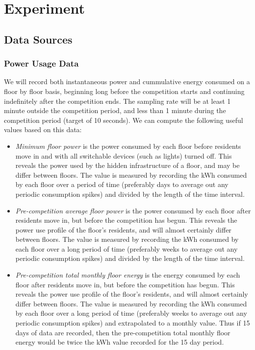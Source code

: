 \chapter{Experiment}


\section{Data Sources}

\subsection{Power Usage Data}
\label{sec:power-usage-data}

We will record both instantaneous power and cummulative energy consumed on a floor by floor basis, beginning long before the competition starts and continuing indefinitely after the competition ends. The sampling rate will be at least 1 minute outside the competition period, and less than 1 minute during the competition period (target of 10 seconds). We can compute the following useful values based on this data:

\begin{itemize}

\item \emph{Minimum floor power} is the power consumed by each floor before residents move in and with all switchable devices (such as lights) turned off. This reveals the power used by the hidden infrastructure of a floor, and may be differ between floors. The value is measured by recording the kWh consumed by each floor over a period of time (preferably days to average out any periodic consumption spikes) and divided by the length of the time interval.

\item \emph{Pre-competition average floor power} is the power consumed by each floor after residents move in, but before the competition has begun. This reveals the power use profile of the floor's residents, and will almost certainly differ between floors. The value is measured by recording the kWh consumed by each floor over a long period of time (preferably weeks to average out any periodic consumption spikes) and divided by the length of the time interval.

\item \emph{Pre-competition total monthly floor energy} is the energy consumed by each floor after residents move in, but before the competition has begun. This reveals the power use profile of the floor's residents, and will almost certainly differ between floors. The value is measured by recording the kWh consumed by each floor over a long period of time (preferably weeks to average out any periodic consumption spikes) and extrapolated to a monthly value. Thus if 15 days of data are recorded, then the pre-competition total monthly floor energy would be twice the kWh value recorded for the 15 day period.

\end{itemize}

